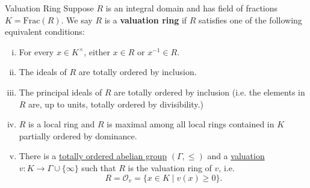 \begin{definition}{Valuation Ring}{}
    Suppose $R$ is an integral domain and has field of fractions $K=\mathrm{Frac}\left(R\right)$. We say $R$ is a \textbf{valuation ring} if $R$ satisfies one of the following equivalent conditions:
    \begin{enumerate}[(i)]
        \item For every $x\in K^\times$, either $x\in R$ or $x^{-1}\in R$.
        \item The ideals of $R$ are totally ordered by inclusion.
        \item The principal ideals of $R$ are totally ordered by inclusion (i.e. the elements in $R$ are, up to units, totally ordered by divisibility.)
        \item $R$ is a local ring and $R$ is maximal among all local rings contained in $K$ partially ordered by dominance.
        \item There is a \hyperref[th:totally_ordered_abelian_group]{totally ordered abelian group} $\left(\Gamma,\le\right)$ and a \hyperref[th:valuation_of_field]{valuation} $v:K \rightarrow \Gamma \cup\{\infty\}$ such that $R$ is the valuation ring of $v$, i.e.
        \[
            R=\mathcal{O}_v=\{x \in K \mid v(x) \ge 0\}.
        \]
    \end{enumerate}
\end{definition}


